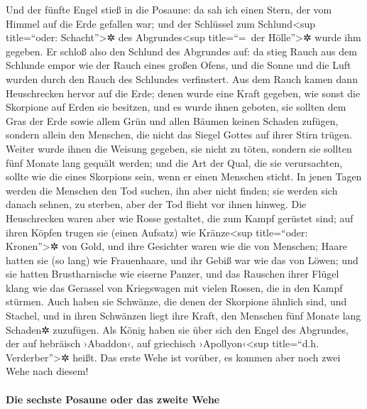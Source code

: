  Und der fünfte Engel stieß in die Posaune: da sah ich
einen Stern, der vom Himmel auf die Erde gefallen war; und der Schlüssel
zum Schlund\textless sup title=``oder: Schacht''\textgreater✲ des
Abgrundes\textless sup title=``=~der Hölle''\textgreater✲ wurde ihm
gegeben.  Er schloß also den Schlund des Abgrundes auf: da
stieg Rauch aus dem Schlunde empor wie der Rauch eines großen Ofens, und
die Sonne und die Luft wurden durch den Rauch des Schlundes verfinstert.
 Aus dem Rauch kamen dann Heuschrecken hervor auf die
Erde; denen wurde eine Kraft gegeben, wie sonst die Skorpione auf Erden
sie besitzen,  und es wurde ihnen geboten, sie sollten dem
Gras der Erde sowie allem Grün und allen Bäumen keinen Schaden zufügen,
sondern allein den Menschen, die nicht das Siegel Gottes auf ihrer Stirn
trügen.  Weiter wurde ihnen die Weisung gegeben, sie nicht
zu töten, sondern sie sollten fünf Monate lang gequält werden; und die
Art der Qual, die sie verursachten, sollte wie die eines Skorpions sein,
wenn er einen Menschen sticht.  In jenen Tagen werden die
Menschen den Tod suchen, ihn aber nicht finden; sie werden sich danach
sehnen, zu sterben, aber der Tod flieht vor ihnen hinweg. 
Die Heuschrecken waren aber wie Rosse gestaltet, die zum Kampf gerüstet
sind; auf ihren Köpfen trugen sie (einen Aufsatz) wie
Kränze\textless sup title=``oder: Kronen''\textgreater✲ von Gold, und
ihre Gesichter waren wie die von Menschen;  Haare hatten
sie (so lang) wie Frauenhaare, und ihr Gebiß war wie das von Löwen;
 und sie hatten Brustharnische wie eiserne Panzer, und das
Rauschen ihrer Flügel klang wie das Gerassel von Kriegswagen mit vielen
Rossen, die in den Kampf stürmen.  Auch haben sie
Schwänze, die denen der Skorpione ähnlich sind, und Stachel, und in
ihren Schwänzen liegt ihre Kraft, den Menschen fünf Monate lang Schaden✲
zuzufügen.  Als König haben sie über sich den Engel des
Abgrundes, der auf hebräisch ›Abaddon‹, auf griechisch
›Apollyon‹\textless sup title=``d.h. Verderber''\textgreater✲ heißt.
 Das erste Wehe ist vorüber, es kommen aber noch zwei
Wehe nach diesem!

\hypertarget{die-sechste-posaune-oder-das-zweite-wehe}{%
\paragraph{Die sechste Posaune oder das zweite
Wehe}\label{die-sechste-posaune-oder-das-zweite-wehe}}

